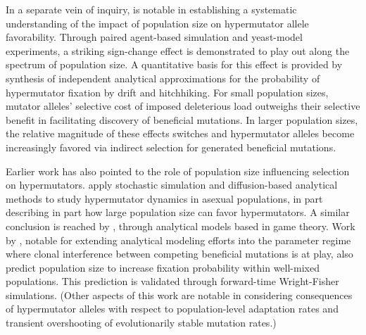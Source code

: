 In a separate vein of inquiry, \citet{raynes2018sign} is notable in establishing a systematic understanding of the impact of population size on hypermutator allele favorability.
Through paired agent-based simulation and yeast-model experiments, a striking sign-change effect is demonstrated to play out along the spectrum of population size.
A quantitative basis for this effect is provided by synthesis of independent analytical approximations for the probability of hypermutator fixation by drift and hitchhiking.
For small population sizes, mutator alleles' selective cost of imposed deleterious load outweighs their selective benefit in facilitating discovery of beneficial mutations.
In larger population sizes, the relative magnitude of these effects switches and hypermutator alleles become increasingly favored via indirect selection for generated beneficial mutations.

Earlier work has also pointed to the role of population size influencing selection on hypermutators.
\citet{wylie2009fixation} apply stochastic simulation and diffusion-based analytical methods to study hypermutator dynamics in asexual populations, in part describing in part how large population size can favor hypermutators.
A similar conclusion is reached by \citet{andre2006evolution}, through analytical models based in game theory.
Work by \citet{good2016evolution}, notable for extending analytical modeling efforts into the parameter regime where clonal interference between competing beneficial mutations is at play, also predict population size to increase fixation probability within well-mixed populations.
This prediction is validated through forward-time Wright-Fisher simulations.
(Other aspects of this work are notable in considering consequences of hypermutator alleles with respect to population-level adaptation rates and transient overshooting of evolutionarily stable mutation rates.)

